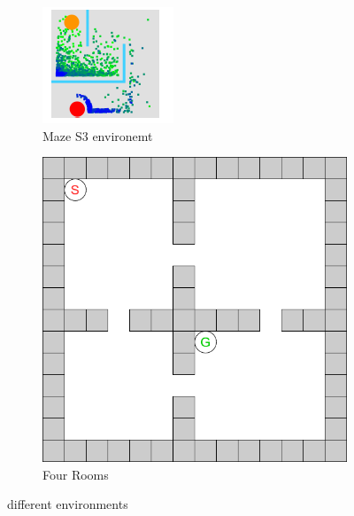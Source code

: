 \documentclass[bibliography=totoc]{scrartcl}
\begin{document}
\begin{figure}[H]
	\centering
	\begin{subfigure}[b]{0.3\linewidth}
		\includegraphics[width=\linewidth]{img/Maze_s3.png}
        \caption{Maze S3 environemt}	
    \end{subfigure}
	\hspace{0.02\textwidth}
	\begin{subfigure}[b]{0.3\linewidth}
		\includegraphics[width=\linewidth]{img/Four_Rooms.png}
		\caption{Four Rooms}
	\end{subfigure}
 	\caption{different environments}
	\label{fig:differentenvironments}
\end{figure}
\end{document}
